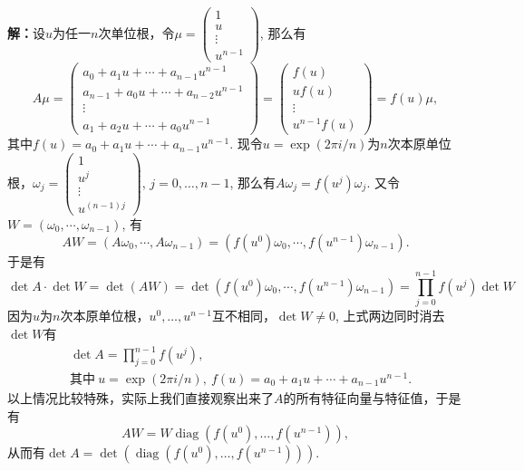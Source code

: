 \newpageorvspace

{\bf 解：}设$u$为任一$n$次单位根，令$\mu = \begin{pmatrix} 1 \\ u \\ \vdots \\ u^{n-1} \end{pmatrix}$, 那么有
$$A\mu = \begin{pmatrix} a_0 + a_1u + \cdots + a_{n-1}u^{n-1} \\ a_{n-1} + a_0u + \cdots + a_{n-2}u^{n-1} \\ \vdots \\ a_1 + a_2u + \cdots + a_0u^{n-1} \end{pmatrix} = \begin{pmatrix} f(u) \\ uf(u) \\ \vdots \\ u^{n-1}f(u) \end{pmatrix} = f(u)\mu,$$
其中$f(u) = a_0 + a_1u + \cdots + a_{n-1}u^{n-1}$. 现令$u = \exp(2\pi i/n)$为$n$次本原单位根，$\omega_j = \begin{pmatrix} 1 \\ u^j \\ \vdots \\ u^{(n-1)j} \end{pmatrix}$, $j=0,\ldots,n-1$, 那么有$A\omega_j = f(u^j)\omega_j$. 又令$W = (\omega_0, \cdots, \omega_{n-1})$, 有
$$AW = (A\omega_0, \cdots, A\omega_{n-1}) = (f(u^0)\omega_0, \cdots, f(u^{n-1})\omega_{n-1}).$$
于是有
$$\det A \cdot \det W = \det(AW) = \det(f(u^0)\omega_0, \cdots, f(u^{n-1})\omega_{n-1}) = \prod_{j=0}^{n-1}f(u^j) \det W$$
因为$u$为$n$次本原单位根，$u^0, \ldots, u^{n-1}$互不相同，$\det W \neq 0$, 上式两边同时消去$\det W$有
\begin{align*}
& \det A = \prod_{j=0}^{n-1}f(u^j), \\
& \text{其中}\  u = \exp(2\pi i/n), \ f(u) = a_0 + a_1u + \cdots + a_{n-1}u^{n-1}.
\end{align*}
以上情况比较特殊，实际上我们直接观察出来了$A$的所有特征向量与特征值，于是有
$$AW = W\operatorname{diag}(f(u^0), \ldots, f(u^{n-1})),$$
从而有$\det A = \det(\operatorname{diag}(f(u^0), \ldots, f(u^{n-1})))$.

\fi  %


